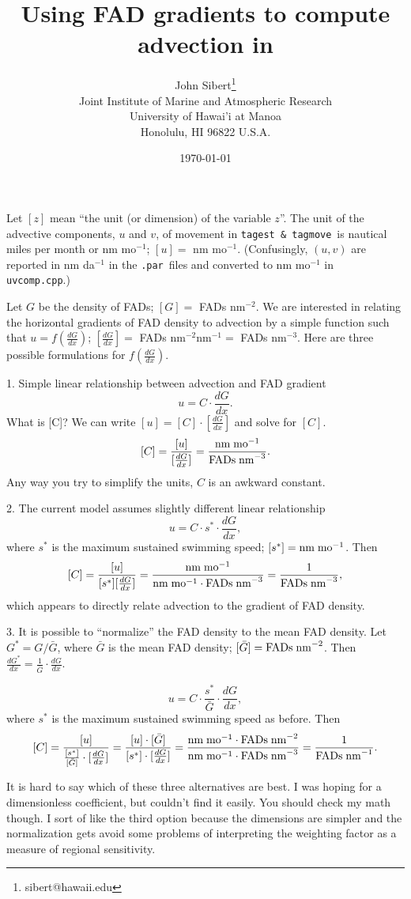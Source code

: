 \documentclass[12pt,letterpaper]{article}
\author{
John Sibert\thanks{sibert@hawaii.edu}\\
Joint Institute of Marine and Atmospheric Research\\
University of Hawai'i at Manoa\\
Honolulu, HI  96822 U.S.A.\\[0.125in]
\date{\today}
}
\title{Using FAD gradients to compute advection in \TT}
\newcommand\doublespacing{\baselineskip=1.6\normalbaselineskip}
\newcommand\TT{{\tt tagest \& tagmove}}
\newcommand\PAR{{\tt .par}}
\begin{document}
\maketitle

\doublespacing

Let $[z]$ mean ``the unit (or dimension) of the variable $z$''.
The unit of the advective components, $u$ and $v$, of movement in \TT\
is nautical miles per month or nm mo$^{-1}$; 
$[u] = $ nm mo$^{-1}$.
(Confusingly, $(u,v)$ are reported in
nm da$^{-1}$ in the \PAR\ files and converted to nm mo$^{-1}$ in {\tt
uvcomp.cpp}.) 

Let $G$ be the density of FADs;  $[G] = $ FADs nm$^{-2}$. We are
interested in relating the horizontal gradients of FAD density to
advection  by a simple function such that $u = f(\frac{dG}{dx})$;
$[\frac{dG}{dx}] = $ FADs nm$^{-2}$nm$^{-1} = $ FADs nm$^{-3}$. Here
are three possible formulations for $f(\frac{dG}{dx})$.

1. Simple linear relationship between advection and
FAD gradient 
\[
u = C\cdot \frac{dG}{dx}
.\] 
What is [C]? 
We can write $[u] = [C]\cdot [\frac{dG}{dx}]$ and solve for $[C]$.
\[
[C] = \frac{[u]}{[\frac{dG}{dx}]} 
    = \frac{{\rm nm\; mo}^{-1}}{\rm{FADs\;nm}^{-3}}
.
\]
Any way you try to simplify the units, $C$ is an awkward constant.

2. The current model assumes slightly different linear relationship
\[
u = C \cdot s^* \cdot \frac{dG}{dx},
\]
where $s^*$ is the maximum sustained swimming speed;
$[s^*] = {\rm nm\; mo}^{-1}$.
Then
\[
[C] = \frac{[u]}{[s^*][\frac{dG}{dx}]} 
    = \frac{{\rm nm\; mo}^{-1}}{{\rm nm\; mo}^{-1}\cdot\rm{FADs\;nm}^{-3}}
    = \frac{1}{\rm{FADs\;nm}^{-3}}
,\]
which appears to directly relate advection to the gradient of FAD
density.

3. It is possible to ``normalize'' the FAD density to the mean FAD
density. Let $G^* = G/\bar{G}$, where $\bar{G}$ is the mean FAD
density; $[\bar{G}] = {\rm{FADs\;nm}^{-2}}$.
Then $\frac{dG^*}{dx} = \frac{1}{\bar{G}}\cdot\frac{dG}{dx}$.


\[
u = C \cdot \frac{s^*}{\bar{G}} \cdot \frac{dG}{dx},
\]
where $s^*$ is the maximum sustained swimming speed as before.
Then
\[
[C] = \frac{[u]}{\frac{[s^*]}{[\bar{G}]}\cdot[\frac{dG}{dx}]} 
    = \frac{[u]\cdot[\bar{G}]}{[s^*]\cdot[\frac{dG}{dx}]} 
    = \frac{{\rm nm\; mo}^{-1}\cdot{\rm{FADs\;nm}^{-2}}}{{\rm nm\; mo}^{-1}\cdot\rm{FADs\;nm}^{-3}}
    = \frac{1}{\rm{FADs\;nm}^{-1}}
.\]

It is hard to say which of these three alternatives are best. I was
hoping for a dimensionless coefficient, but couldn't find it easily.
You should check my math though. I sort of like the third option
because the dimensions are simpler and the normalization gets avoid
some problems of interpreting the weighting factor as a measure of
regional sensitivity.
\end{document}
